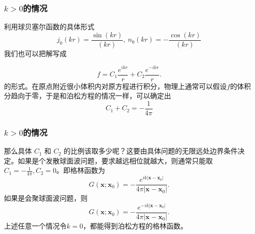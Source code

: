\documentclass[CJK]{beamer}
\begin{document}
\begin{frame}
  \frametitle{$k>0$的情况}
  利用球贝塞尔函数的具体形式
  $$ j_0(kr) = \frac{\sin(kr)}{(kr)},\ n_0(kr) = -\frac{\cos(kr)}{(kr)}$$
  我们也可以把解写成

  $$ f = C_1\frac{e^{ikr}}{r} + C_2\frac{e^{-ikr}}{r}. $$
  的形式。在原点附近很小体积内对原方程进行积分，物理上通常可以假设$f$的体积分趋向于零，于是和泊松方程的情况一样，可以确定出
   $$ C_1+C_2=-\frac{1}{4\pi}$$
\end{frame}

\begin{frame}
  \frametitle{$k>0$的情况}
  那么具体 $C_1$ 和 $C_2$ 的比例该取多少呢？这要由具体问题的无限远处边界条件决定。如果是个发散球面波问题，要求越远相位就越大，则通常只能取 $C_1=-\frac{1}{4\pi}, C_2=0$。即格林函数为
  $$ G(\mathbf{x};\mathbf{x}_0) = -\frac{e^{ik|\mathbf{x}-\mathbf{x}_0|}}{4\pi |\mathbf{x}-\mathbf{x}_0|}.$$
  如果是会聚球面波问题，则
  $$ G(\mathbf{x};\mathbf{x}_0) = -\frac{e^{-ik|\mathbf{x}-\mathbf{x}_0|}}{4\pi |\mathbf{x}-\mathbf{x}_0|}.$$  
  上述任意一个情况令$k=0$，都能得到泊松方程的格林函数。
    
\end{frame}


\ech
\end{document}
